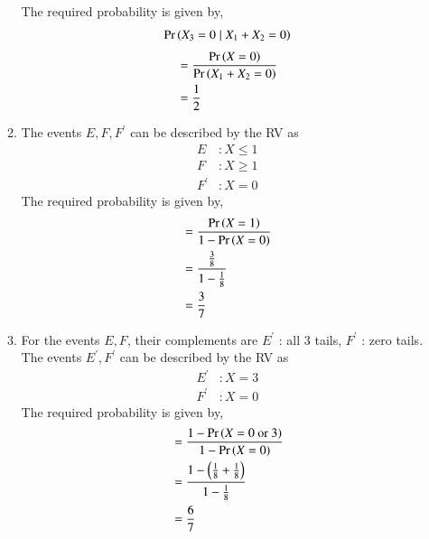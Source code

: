 \documentclass[journal,12pt,twocolumn]{IEEEtran}
\begin{document}
\begin{enumerate}
\begin{enumerate}
The required probability is given by,
\begin{align}
\Pr\left(X_3 = 0 \mid X_1 + X_2 = 0\right)
\end{align}
\begin{align}
&= \frac{\Pr\left(X = 0\right)}{\Pr\left(X_1 + X_2 = 0\right)}\\
&= \frac{1}{2}
\end{align}

\item  The events $E, F, F^{\prime}$ can be described by the RV as
\begin{align}
E &: X \leq 1\\
F &: X \geq 1\\
F^{\prime} &: X = 0 
\end{align}
The required probability is given by,
\begin{align}
&= \frac{\Pr\left(X = 1\right)}{1 - \Pr\left(X = 0\right)}\\
&= \frac{\frac{3}{8}}{1-\frac{1}{8}}\\
&= \frac{3}{7}
\end{align}


\item  For the events $E, F$, their complements are
$E^{\prime}$ : all 3 tails, $F^{\prime}$ : zero tails. The events $E^{\prime}, F^{\prime}$ can be described by the RV as
\begin{align}
E^{\prime} &: X = 3\\
F^{\prime} &: X = 0 
\end{align}
The required probability is given by,
\begin{align}
&= \frac{1 - \Pr\left(X = 0 \text{ or }3\right)}{1 - \Pr\left(X = 0\right)}\\
&= \frac{1 - \left(\frac{1}{8} + \frac{1}{8}\right)}{1-\frac{1}{8}}\\
&= \frac{6}{7}
\end{align}

\end{enumerate}
\end{enumerate}
\end{document}
